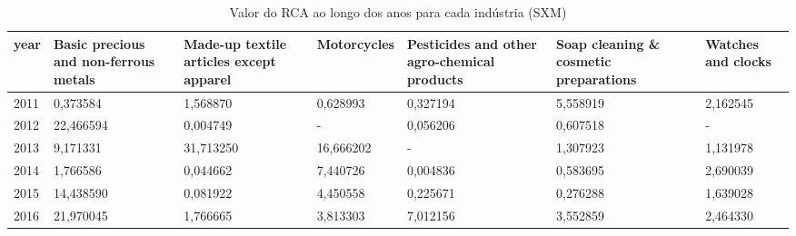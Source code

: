 \begin{table}
\centering
\caption{Valor do RCA ao longo dos anos para cada indústria (SXM)}
\begin{tabular}{p{1cm}p{2cm}p{2cm}p{2cm}p{2cm}p{2cm}p{2cm}}
\toprule
 year &  Basic precious and non-ferrous metals &  Made-up textile articles except apparel &  Motorcycles &  Pesticides and other agro-chemical products &  Soap cleaning \& cosmetic preparations &  Watches and clocks \\
\midrule
 2011 &                               0,373584 &                                 1,568870 &     0,628993 &                                     0,327194 &                               5,558919 &            2,162545 \\
 2012 &                              22,466594 &                                 0,004749 &            - &                                     0,056206 &                               0,607518 &                   - \\
 2013 &                               9,171331 &                                31,713250 &    16,666202 &                                            - &                               1,307923 &            1,131978 \\
 2014 &                               1,766586 &                                 0,044662 &     7,440726 &                                     0,004836 &                               0,583695 &            2,690039 \\
 2015 &                              14,438590 &                                 0,081922 &     4,450558 &                                     0,225671 &                               0,276288 &            1,639028 \\
 2016 &                              21,970045 &                                 1,766665 &     3,813303 &                                     7,012156 &                               3,552859 &            2,464330 \\
\bottomrule
\end{tabular}
\end{table}
